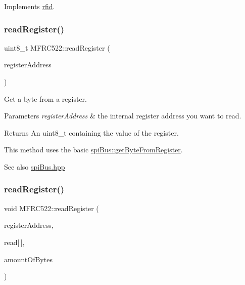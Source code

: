 Implements \mbox{\hyperlink{classrfid_a9790d273f2385c8fb48bb85ca2aa0d10}{rfid}}.

\mbox{\label{class_m_f_r_c522_afe0e86db047ef36af49349e7fdc7fa65}} 
\subsubsection{\texorpdfstring{read\+Register()}{readRegister()}\hspace{0.1cm}{\footnotesize\ttfamily [1/2]}}
{\footnotesize\ttfamily uint8\+\_\+t M\+F\+R\+C522\+::read\+Register (\begin{DoxyParamCaption}\item[{\mbox{\hyperlink{class_m_f_r_c522_ae7ec09eb8c9c61288a4770175b4b8db7}{R\+EG}}}]{register\+Address }\end{DoxyParamCaption})\hspace{0.3cm}{\ttfamily [protected]}}



Get a byte from a register. 


\begin{DoxyParams}{Parameters}
{\em register\+Address} & the internal register address you want to read. \\
\hline
\end{DoxyParams}
\begin{DoxyReturn}{Returns}
An uint8\+\_\+t containing the value of the register.
\end{DoxyReturn}
This method uses the basic \mbox{\hyperlink{classspi_bus_ab6b195b235dd0a1dad2f7cec3d997ffb}{spi\+Bus\+::get\+Byte\+From\+Register}}. \begin{DoxySeeAlso}{See also}
\mbox{\hyperlink{spi_bus_8hpp_source}{spi\+Bus.\+hpp}} 
\end{DoxySeeAlso}
\mbox{\label{class_m_f_r_c522_a559408e38c2c8fea3316f6e2b4477b81}} 
\subsubsection{\texorpdfstring{read\+Register()}{readRegister()}\hspace{0.1cm}{\footnotesize\ttfamily [2/2]}}
{\footnotesize\ttfamily void M\+F\+R\+C522\+::read\+Register (\begin{DoxyParamCaption}\item[{\mbox{\hyperlink{class_m_f_r_c522_ae7ec09eb8c9c61288a4770175b4b8db7}{R\+EG}}}]{register\+Address,  }\item[{uint8\+\_\+t}]{read\mbox{[}$\,$\mbox{]},  }\item[{uint8\+\_\+t}]{amount\+Of\+Bytes }\end{DoxyParamCaption})\hspace{0.3cm}{\ttfamily [protected]}}



